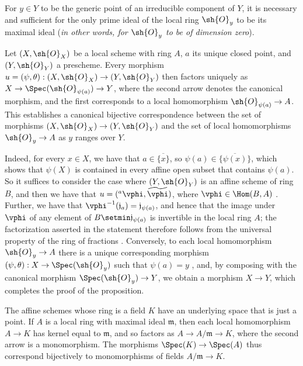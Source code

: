 \begin{corollary}[2.4.3]
\label{I.2.4.3}
For $y\in Y$ to be the generic point of an irreducible component of $Y$, it is necessary and sufficient for the only prime ideal of the local ring $\sh{O}_y$ to be its maximal ideal (\emph{in other words, for $\sh{O}_y$ to be of \emph{dimension zero}}).
\end{corollary}

\begin{proposition}[2.4.4]
\label{I.2.4.4}
Let $(X,\sh{O}_X)$ be a local scheme with ring $A$, $a$ its unique closed point, and $(Y,\sh{O}_Y)$ a prescheme.
Every morphism $u=(\psi,\theta):(X,\sh{O}_X)\to(Y,\sh{O}_Y)$ then factors uniquely as $X\to\Spec(\sh{O}_{\psi(a)})\to Y$, where the second arrow denotes the canonical morphism, and the first corresponds to a local homomorphism $\sh{O}_{\psi(a)}\to A$.
This establishes a canonical bijective correspondence between the set of morphisms $(X,\sh{O}_X)\to(Y,\sh{O}_Y)$ and the set of local homomorphisms $\sh{O}_y\to A$ as $y$ ranges over $Y$.
\end{proposition}

Indeed, for every $x\in X$, we have that $a\in\overline{\{x\}}$, so $\psi(a)\in\overline{\{\psi(x)\}}$, which shows that $\psi(X)$ is contained in every affine open subset that contains $\psi(a)$.
So it suffices to consider the case where $(Y,\sh{O}_Y)$ is an affine scheme of ring $B$, and then we have that $u=({}^a\vphi,\widetilde{\vphi})$, where $\vphi\in\Hom(B,A)$ .
Further, we have that $\vphi^{-1}(\mathfrak{j}_a)=\mathfrak{j}_{\psi(a)}$, and hence that the image under $\vphi$ of any element of $B\setmin\mathfrak{j}_{\psi(a)}$ is invertible in the local ring $A$;
the factorization asserted in the statement therefore follows from the universal property of the ring of fractions .
Conversely, to each local homomorphism $\sh{O}_y\to A$ there is a unique corresponding morphism $(\psi,\theta):X\to\Spec(\sh{O}_y)$ such that $\psi(a)=y$ , and, by composing with the canonical morphism $\Spec(\sh{O}_y)\to Y$, we obtain a morphism $X\to Y$, which completes the proof of the proposition.

\begin{env}[2.4.5]
\label{I.2.4.5}
The affine schemes whose ring is a field $K$ have an underlying space that is just a point.
If $A$ is a local ring with maximal ideal $\mathfrak{m}$, then each local homomorphism $A\to K$ has kernel equal to $\mathfrak{m}$, and so factors as $A\to A/\mathfrak{m}\to K$, where the second arrow is a monomorphism.
The morphisms $\Spec(K)\to\Spec(A)$ thus correspond bijectively to monomorphisms of fields $A/\mathfrak{m}\to K$.
\end{env}

